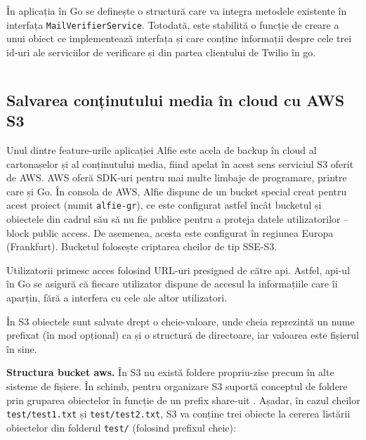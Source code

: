 În aplicația în Go se definește o structură care va integra metodele existente în interfața \texttt{MailVerifierService}. Totodată, este stabilită o funcție de creare a unui obiect ce implementează interfața și care conține informații despre cele trei id-uri ale serviciilor de verificare și din partea clientului de Twilio în go.

\begin{code}
    \inputminted[frame=single,framesep=2mm,linenos,breaklines,tabsize=2]{go}{code/mail-verifier-service.go}
    \label{code:go_mail_verifier_service}
\end{code}

\subsection{Salvarea conținutului media în cloud cu AWS S3}

Unul dintre feature-urile aplicației Alfie este acela de backup în cloud al cartonașelor și al conținutului media, fiind apelat în acest sens serviciul S3 oferit de AWS. AWS oferă SDK-uri pentru mai multe limbaje de programare, printre care și Go. În consola de AWS, Alfie dispune de un bucket special creat pentru acest proiect (numit \texttt{alfie-gr}), ce este configurat astfel încât bucketul și obiectele din cadrul său să nu fie publice pentru a proteja datele utilizatorilor – block public access. De asemenea, acesta este configurat în regiunea Europa (Frankfurt). Bucketul folosește criptarea cheilor de tip SSE-S3.

Utilizatorii primesc acces folosind URL-uri presigned de către api. Astfel, api-ul în Go se asigură că fiecare utilizator dispune de accesul la informațiile care îi aparțin, fără a interfera cu cele ale altor utilizatori.

În S3 obiectele sunt salvate drept o cheie-valoare, unde cheia reprezintă un nume prefixat (în mod opțional) ca și o structură de directoare, iar valoarea este fișierul în sine.

\textbf{Structura bucket aws.} În S3 nu există foldere propriu-zise precum în alte sisteme de fișiere. În schimb, pentru organizare S3 suportă conceptul de foldere prin gruparea obiectelor în funcție de un prefix share-uit \cite{s3Folders}. Așadar, în cazul cheilor \texttt{test/test1.txt} și \texttt{test/test2.txt}, S3 va conține trei obiecte la cererea listării obiectelor din folderul \texttt{test/} (folosind prefixul cheie):

